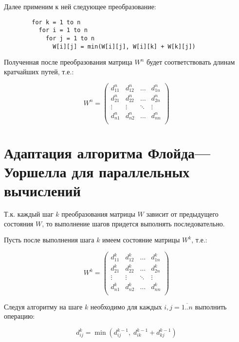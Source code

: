 \documentclass{article}
\begin{document}
		Далее применим к ней следующее преобразование:
		
		\begin{verbatim}
		for k = 1 to n
		  for i = 1 to n
		    for j = 1 to n
		      W[i][j] = min(W[i][j], W[i][k] + W[k][j])
		\end{verbatim}
		
		Полученная после преобразования матрица $W^n$ будет соответствовать длинам кратчайших путей, т.е.:
		
		\begin{displaymath}
			W^n =
			\left(
				\begin{array}{cccc}
					d_{11}^{n} & d_{12}^{n} & \dots  & d_{1n}^{n} \\
					d_{21}^{n} & d_{22}^{n} & \dots  & d_{2n}^{n} \\
					\vdots     & \vdots     & \ddots & \vdots     \\
					d_{n1}^{n} & d_{n2}^{n} & \dots  & d_{nn}^{n} \\
				\end{array} 
			\right)
		\end{displaymath}
		

\section{Адаптация алгоритма Флойда---Уоршелла для параллельных вычислений}

	Т.к. каждый шаг $k$ преобразования матрицы $W$ зависит от предыдущего состояния $W$, то выполнение шагов придется выполнять последовательно.
	
	Пусть после выполнения шага $k$ имеем состояние матрицы $W^k$, т.е.:
	
	\begin{displaymath}
		W^k =
		\left(
			\begin{array}{cccc}
				d_{11}^{k} & d_{12}^{k} & \dots  & d_{1n}^{k} \\
				d_{21}^{k} & d_{22}^{k} & \dots  & d_{2n}^{k} \\
				\vdots     & \vdots     & \ddots & \vdots     \\
				d_{n1}^{k} & d_{n2}^{k} & \dots  & d_{nn}^{k} \\
			\end{array} 
		\right)
	\end{displaymath}
	
	Следуя алгоритму на шаге $k$ необходимо для каждых $i,j=\overline{1..n}$ выполнить операцию:
	
	\begin{equation} \label{updateElement}
		d_{i j}^{k} = \min (d_{i j}^{k-1},\; d_{i k}^{k-1} + d_{k j}^{k-1})
	\end{equation}
	
\end{document}
